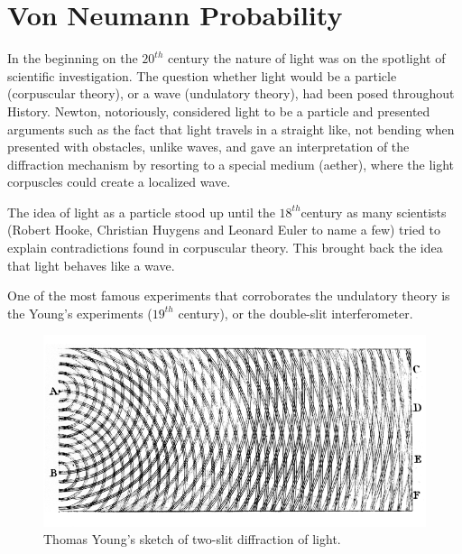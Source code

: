 \clearpage
\section{Von Neumann Probability}

\label{sec:von_neumann_probability}


 
In the beginning on the $20^{th}$ century the nature of light was on the spotlight of scientific investigation. The question whether light would be a particle (corpuscular theory), or a wave (undulatory theory), had been posed throughout History. Newton, notoriously, considered light to be a particle and presented arguments such as the fact that light travels in a straight like, not bending when presented with obstacles, unlike waves, and gave an interpretation of the diffraction mechanism by resorting to a special medium (aether), where the light corpuscles could create a localized wave\cite{DiasdeDeus:1387968}. 


The idea of light as a particle stood up until the $18^{th}$century as many scientists (Robert Hooke, Christian Huygens and Leonard Euler to name a few) tried to explain contradictions found in corpuscular theory. This brought back the idea that light behaves like a wave. 

One of the most famous experiments that corroborates the undulatory theory is the Young's experiments ($19^{th}$ century), or the double-slit interferometer.

\begin{figure}[h]
\centering 

\includegraphics[scale=0.25]{Figures/Young_Diffraction.png}

\caption[Caption for LOF]
{Thomas Young's sketch of two-slit diffraction of light.} %

\label{fig:double_slit}
\end{figure}

